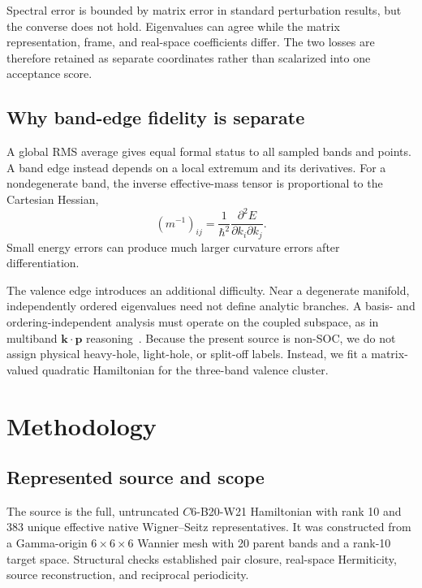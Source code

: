 \documentclass[11pt]{article}
\newcommand{\kvec}{\mathbf{k}}
\begin{document}
Spectral error is bounded by matrix error in standard perturbation results, but the
converse does not hold.  Eigenvalues can agree while the matrix representation, frame,
and real-space coefficients differ.  The two losses are therefore retained as separate
coordinates rather than scalarized into one acceptance score.

\subsection{Why band-edge fidelity is separate}

A global RMS average gives equal formal status to all sampled bands and points.  A band
edge instead depends on a local extremum and its derivatives.  For a nondegenerate band,
the inverse effective-mass tensor is proportional to the Cartesian Hessian,
\begin{equation}
  (m^{-1})_{ij}=\frac{1}{\hbar^2}
  \frac{\partial^2 E}{\partial k_i\partial k_j}.
  \label{eq:mass}
\end{equation}
Small energy errors can produce much larger curvature errors after differentiation.

The valence edge introduces an additional difficulty.  Near a degenerate manifold,
independently ordered eigenvalues need not define analytic branches.  A basis- and
ordering-independent analysis must operate on the coupled subspace, as in multiband
\(\kvec\cdot\mathbf p\) reasoning~\cite{LuttingerKohn1955}.  Because the present source
is non-SOC, we do not assign physical heavy-hole, light-hole, or split-off labels.
Instead, we fit a matrix-valued quadratic Hamiltonian for the three-band valence
cluster.

\section{Methodology}

\subsection{Represented source and scope}

The source is the full, untruncated \(C6\)-B20-W21 Hamiltonian with rank 10 and 383
unique effective native Wigner--Seitz representatives.  It was constructed from a
Gamma-origin \(6\times6\times6\) Wannier mesh with 20 parent bands and a rank-10 target
space.  Structural checks established pair closure, real-space Hermiticity, source
reconstruction, and reciprocal periodicity.
\end{document}
